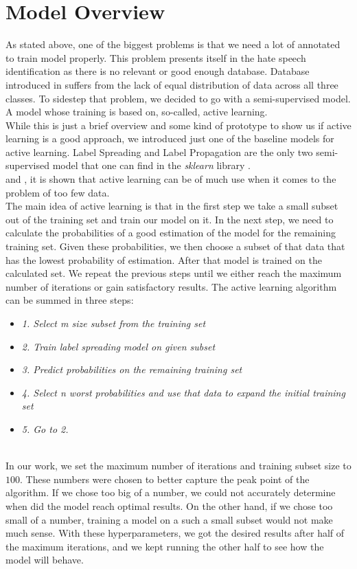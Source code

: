\documentclass[10pt, a4paper]{article}
\begin{document}
	\section{Model Overview}
	As stated above, one of the biggest problems is that we need a lot of annotated to train model properly. This problem presents itself in the hate speech identification as there is no relevant or good enough database. Database introduced in \citet{Davidson2017AutomatedHS} suffers from the lack of equal distribution of data across all three classes. To sidestep that problem, we decided to go with a semi-supervised model. A model whose training is based on, so-called, active learning.
	\\While this is just a brief overview and some kind of prototype to show us if active learning is a good approach, we introduced just one of the baseline models for active learning. Label Spreading and Label Propagation are the only two semi-supervised model that one can find in the \textit{sklearn} library \citep{scikit-learn}.
	\\\citet{LuoALPlankton} and \citet{YangMultiClassAL}, it is shown that active learning can be of much use when it comes to the problem of too few data.
	\\The main idea of active learning is that in the first step we take a small subset out of the training set and train our model on it. In the next step, we need to calculate the  probabilities of a good estimation of the model for the remaining training set. Given these probabilities, we then choose a subset of that data that has the lowest probability of estimation. After that model is trained on the calculated set. We repeat the previous steps until we either reach the maximum number of iterations or gain satisfactory results.
	The active learning algorithm can be summed in three steps:
	\begin{itemize}
		\item \textit{1. Select m size subset from the training set}
		\item \textit{2. Train label spreading model on given subset}
		\item \textit{3. Predict probabilities on the remaining training set}
		\item \textit{4. Select n worst probabilities and  use that data to expand the initial training set}
		\item \textit{5. Go to 2.}
	\end{itemize}
	\\In our work, we set the maximum number of iterations and training subset size to $100$. These numbers were chosen to better capture the peak point of the algorithm. If we chose too big of a number, we could not accurately determine when did the model reach optimal results. On the other hand, if we chose too small of a number, training a model on a such a small subset would not make much sense. With these hyperparameters, we got the desired results after half of the maximum iterations, and we kept running the other half to see how the model will behave.
	
\end{document}
